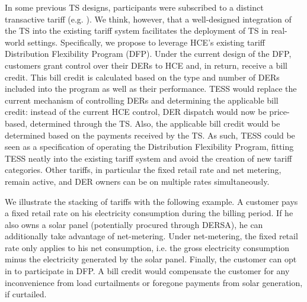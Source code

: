 In some previous TS designs, participants were subscribed to a distinct transactive tariff (e.g. \citet{Widergren2014}).
We think, however, that a well-designed integration of the TS into the existing tariff system facilitates the deployment of TS in real-world settings. Specifically, we propose to leverage HCE's existing tariff Distribution Flexibility Program (DFP). Under the current design of the DFP, customers grant control over their DERs to HCE and, in return, receive a bill credit. This bill credit is calculated based on the type and number of DERs included into the program as well as their performance. TESS would replace the current mechanism of controlling DERs and determining the applicable bill credit: instead of the current HCE control, DER dispatch would now be price-based, determined through the TS. Also, the applicable bill credit would be determined based on the payments received by the TS. As such, TESS could be seen as a specification of operating the Distribution Flexibility Program, fitting TESS neatly into the existing tariff system and avoid the creation of new tariff categories.
Other tariffs, in particular the fixed retail rate and net metering, remain active, and DER owners can be on multiple rates simultaneously. 

We illustrate the stacking of tariffs with the following example. A customer pays a fixed retail rate on his electricity consumption during the billing period. 
If he also owns a solar panel (potentially procured through DERSA), he can additionally take advantage of net-metering. Under net-metering, the fixed retail rate only applies to his net consumption, i.e. the gross electricity consumption minus the electricity generated by the solar panel. 
Finally, the customer can opt in to participate in DFP. A bill credit would compensate the customer for any inconvenience from load curtailments or foregone payments from solar generation, if curtailed.

